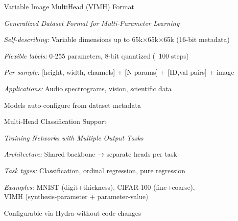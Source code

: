 \begin{slidewhite}[\slideopts,toc={VIMH}]{Variable Image MultiHead (VIMH) Format}
  \vspace{-2.5em}

  \vspace{-0.5em}
  \emph{Generalized Dataset Format for Multi-Parameter Learning}
  \vspace{-0.5em}

  \begin{itemize}
    \mpitem \emph{Self-describing:} Variable dimensions up to 65k×65k×65k (16-bit metadata)

    \mpitem \emph{Flexible labels:} 0-255 parameters, 8-bit quantized (~100 steps)

    \mpitem \emph{Per sample:} [height, width, channels] + [N params] + [ID,val pairs] + image

    \mpitem \emph{Applications:} Audio spectrograms, vision, scientific data

    \mpitem Models auto-configure from dataset metadata
  \end{itemize}
\end{slidewhite}



\begin{slide}[\slideopts,toc={MultiHead}]{Multi-Head Classification Support}

  \vspace{-1em}

  \scalebox{0.7}{
    
  }

  \emph{Training Networks with Multiple Output Tasks}

  \begin{itemize}
    \mpitem \emph{Architecture:} Shared backbone → separate heads per task

    \mpitem \emph{Task types:} Classification, ordinal regression, pure regression

    \mpitem \emph{Examples:} MNIST (digit+thickness), CIFAR-100 (fine+coarse),\\
    VIMH (synthesis-parameter + parameter-value)

    \mpitem Configurable via Hydra without code changes
  \end{itemize}
\end{slide}

